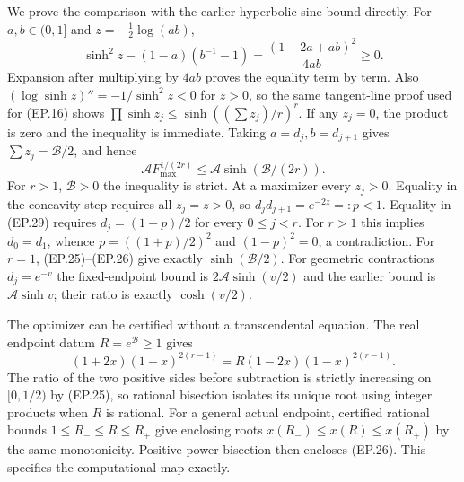 We prove the comparison with the earlier hyperbolic-sine bound directly.
For $a,b\in(0,1]$ and $z=-\tfrac12\log(ab)$,
\[
 \sinh^2z-(1-a)(b^{-1}-1)
 =\frac{(1-2a+ab)^2}{4ab}\ge0.\tag{EP.29}
\]
Expansion after multiplying by $4ab$ proves the equality term by
term. Also $(\log\sinh z)''=-1/\sinh^2z<0$ for $z>0$,
so the same tangent-line proof used for (EP.16) shows
$\prod\sinh z_j\le\sinh((\sum z_j)/r)^r$.
If any $z_j=0$, the product is zero and the inequality is immediate.
Taking $a=d_j,b=d_{j+1}$ gives $\sum z_j=\mathcal B/2$,
and hence
\[
 \mathcal A F_{\max}^{1/(2r)}
 \le\mathcal A\sinh(\mathcal B/(2r)).\tag{EP.30}
\]
For $r>1$, $\mathcal B>0$ the inequality is strict. At a maximizer
every $z_j>0$. Equality in the concavity step requires all $z_j=z>0$,
so $d_jd_{j+1}=e^{-2z}=:p<1$. Equality in (EP.29) requires
$d_j=(1+p)/2$ for every $0\le j<r$. For $r>1$ this implies
$d_0=d_1$, whence $p=((1+p)/2)^2$ and $(1-p)^2=0$, a contradiction.
For $r=1$, (EP.25)--(EP.26) give exactly $\sinh(\mathcal B/2)$.
For geometric contractions $d_j=e^{-v}$ the fixed-endpoint bound
is $2\mathcal A\sinh(v/2)$ and the earlier bound is
$\mathcal A\sinh v$; their ratio is exactly $\cosh(v/2)$.

The optimizer can be certified without a transcendental equation.
The real endpoint datum $R=e^{\mathcal B}\ge1$ gives
\[
 (1+2x)(1+x)^{2(r-1)}
       =R(1-2x)(1-x)^{2(r-1)}.\tag{EP.31}
\]
The ratio of the two positive sides before subtraction is strictly
increasing on $[0,1/2)$ by (EP.25), so rational bisection isolates
its unique root using integer products when $R$ is rational. For a
general actual endpoint, certified rational bounds
$1\le R_-\le R\le R_+$ give enclosing roots
$x(R_-)\le x(R)\le x(R_+)$ by the same monotonicity. Positive-power bisection
then encloses (EP.26). This specifies the computational map exactly.

